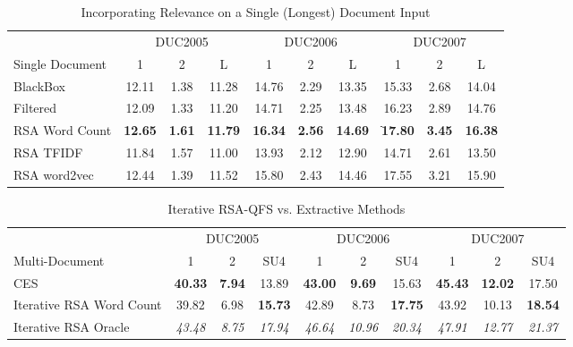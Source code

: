 \documentclass[11pt,a4paper]{article}
\begin{document}
\begin{table*}[t]
\centering
 \begin{small}
    \begin{tabular}{l|ccc|ccc|ccc}
    \toprule
     & \multicolumn{3}{c}{DUC2005}& \multicolumn{3}{c}{DUC2006}& \multicolumn{3}{c}{DUC2007} \\ 
    Single Document & 1 & 2 &  L & 1 & 2 &  L & 1 & 2 &  L \\
    \midrule
    BlackBox & 12.11 & 1.38 & 11.28 & 14.76 & 2.29 & 13.35 & 15.33 & 2.68 & 14.04\\
    Filtered  & 12.09 & 1.33 & 11.20 & 14.71 & 2.25 & 13.48 & 16.23 & 2.89 & 14.76\\
    RSA Word Count  & \textbf{12.65} & \textbf{1.61} & \textbf{11.79} & \textbf{16.34} & \textbf{2.56} & \textbf{14.69} & ֿ\textbf{17.80} & \textbf{3.45} & \textbf{16.38} \\
    RSA TFIDF   & 11.84 & 1.57 & 11.00 & 13.93 & 2.12 & 12.90 & 14.71 & 2.61 & 13.50\\
    RSA word2vec  & 12.44 & 1.39 & 11.52 & 15.80 & 2.43 & 14.46 & 17.55 & 3.21 & 15.90\\
    \bottomrule 
    \end{tabular}
  \end{small}
 \caption{Incorporating Relevance on a Single (Longest) Document Input}
      \label{RSAresultsSingle}
\end{table*}

\begin{table*}[t]
\centering
 \begin{small}
    \begin{tabular}{l|ccc|ccc|ccc}
    \toprule
     & \multicolumn{3}{c}{DUC2005}& \multicolumn{3}{c}{DUC2006}& \multicolumn{3}{c}{DUC2007} \\ 
    Multi-Document & 1 & 2 &  SU4 & 1 & 2 &  SU4 & 1 & 2 &  SU4 \\
    \midrule
    CES & \textbf{40.33} & \textbf{7.94} & 13.89 & \textbf{43.00} & \textbf{9.69} & 15.63 & \textbf{45.43} & \textbf{12.02} & 17.50\\
    Iterative RSA Word Count& 39.82 & 6.98 & \textbf{15.73} & 42.89 & 8.73 & \textbf{17.75} & 43.92 & 10.13 &  \textbf{18.54}\\
    Iterative RSA Oracle & \emph{43.48} & \emph{8.75} & \emph{17.94} & \emph{46.64} & \emph{10.96} & \emph{20.34} & \emph{47.91} & \emph{12.77} & \emph{21.37}\\
    \bottomrule 
    \end{tabular}
  \end{small}
 \caption{Iterative RSA-QFS vs. Extractive Methods}
      \label{RSAresultsMulti}
\end{table*}
\end{document}
